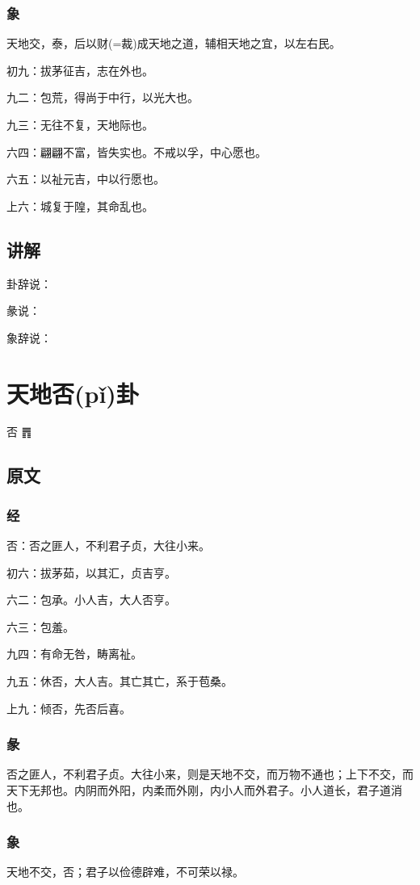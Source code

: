 \documentclass[12pt,oneside]{book}
\begin{document}
\subsection{象}
天地交，泰，后以财(=裁)成天地之道，辅相天地之宜，以左右民。

初九：拔茅征吉，志在外也。

九二：包荒，得尚于中行，以光大也。

九三：无往不复，天地际也。

六四：翩翩不富，皆失实也。不戒以孚，中心愿也。

六五：以祉元吉，中以行愿也。

上六：城复于隍，其命乱也。

\section{讲解}
卦辞说：

彖说：

象辞说：

\chapter{天地否(pǐ)卦}
否 {\Large ䷋}

\section{原文}

\subsection{经}
否：否之匪人，不利君子贞，大往小来。

初六：拔茅茹，以其汇，贞吉亨。

六二：包承。小人吉，大人否亨。

六三：包羞。

九四：有命无咎，畴离祉。

九五：休否，大人吉。其亡其亡，系于苞桑。

上九：倾否，先否后喜。

\subsection{彖}
否之匪人，不利君子贞。大往小来，则是天地不交，而万物不通也；上下不交，而天下无邦也。内阴而外阳，内柔而外刚，内小人而外君子。小人道长，君子道消也。

\subsection{象}
天地不交，否；君子以俭德辟难，不可荣以禄。
\end{document}
